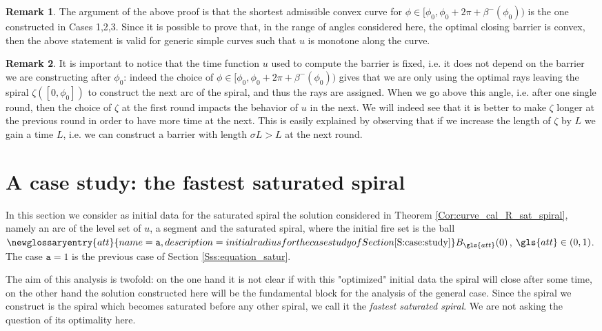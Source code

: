 \documentclass[reqno]{amsart}
\theoremstyle{definition} \newtheorem{definition}{Definition}[section]
\theoremstyle{definition} \newtheorem{remark}[definition]{Remark}
\theoremstyle{plain} \newtheorem{lemma}[definition]{Lemma}
\theoremstyle{plain} \newtheorem{proposition}[definition]{Proposition}
\theoremstyle{plain} \newtheorem{theorem}[definition]{Theorem}
\theoremstyle{plain} \newtheorem{corollary}[definition]{Corollary}
\theoremstyle{definition} \newtheorem{example}[definition]{Example}
\theoremstyle{plain} \newtheorem{claim}[clai]{Claim}
\theoremstyle{definition} \newtheorem{assumption}[definition]{Assumption}
\theoremstyle{definition} \newtheorem{observation}[definition]{Observation}
\newcommand{\1}{\mathbbm 1}
\numberwithin{equation}{section} %
\theoremstyle{plain} \newtheorem*{theorem*}{Theorem}
\theoremstyle{plain} \newtheorem{mthm}[maintheorem]{Main Theorem}
\theoremstyle{plain} \newtheorem*{mthm*}{Main Theorem}
\theoremstyle{plain} \newtheorem*{conjecture*}{Conjecture}
\theoremstyle{plain} \newtheorem{conjecture}[definition]{Conjecture}
\theoremstyle{plain} \newtheorem*{problem*}{Problem}
\begin{document}
\begin{remark}
\label{Rem:optima_for_others}
The argument of the above proof is that the shortest admissible convex curve for $\phi \in [{\phi_0},{\phi_0} + 2\pi + \beta^-({\phi_0}))$ is the one constructed in Cases 1,2,3. Since it is possible to prove that, in the range of angles considered here, the optimal closing barrier is convex, then the above statement is valid for generic simple curves such that $u$ is monotone along the curve.
\end{remark}

\begin{remark}
\label{Rem:other_angles}
It is important to notice that the time function $u$ used to compute the barrier is fixed, i.e. it does not depend on the barrier we are constructing after $\phi_0$: indeed the choice of $\phi \in [{\phi_0},{\phi_0} + 2\pi + \beta^-({\phi_0}))$ gives that we are only using the optimal rays leaving the spiral $\zeta([0,{\phi_0}])$ to construct the next arc of the spiral, and thus the rays are assigned. When we go above this angle, i.e. after one single round, then the choice of $\zeta$ at the first round impacts the behavior of $u$ in the next. We will indeed see that it is better to make $\zeta$ longer at the previous round in order to have more time at the next. This is easily explained by observing that if we increase the length of $\zeta$ by $L$ we gain a time $L$, i.e. we can construct a barrier with length $\sigma L > L$ at the next round.
\end{remark}

\section{A case study: the fastest saturated spiral}
\label{S:case:study}


In this section we consider as initial data for the saturated spiral the solution considered in Theorem \ref{Cor:curve_cal_R_sat_spiral}, namely an arc of the level set of $u$, a segment and the saturated spiral, where the initial fire set is the ball $\newglossaryentry{att}{name=\ensuremath{\mathtt a},description={initial radius for the case study of Section \ref{S:case:study}}} B_{\gls{att}}(0)$, $\gls{att} \in (0,1)$. The case $\mathtt a =1$ is the previous case of Section \ref{Sss:equation_satur}.

The aim of this analysis is twofold: on the one hand it is not clear if with this "optimized" initial data the spiral will close after some time, on the other hand the solution constructed here will be the fundamental block for the analysis of the general case. Since the spiral we construct is the spiral which becomes saturated before any other spiral, we call it the \emph{fastest saturated spiral}. We are not asking the question of its optimality here.
\end{document}
